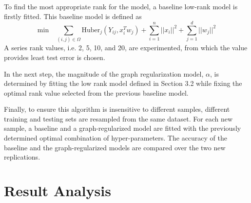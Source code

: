 \documentclass[a4paper]{article}
\begin{document}
To find the most appropriate rank for the model, a baseline low-rank model is firstly fitted. This baseline model is defined as 
\begin{equation*}
\text{min}\quad \sum_{(i,j)\in \Omega}\text{Huber}_j(Y_{ij},x_i^Tw_j)+\sum_{i=1}^n||x_i||^2+\sum_{j=1}^d||w_j||^2
\end{equation*}
A series rank values, i.e. 2, 5, 10, and 20, are experimented, from which the value provides least test error is chosen.

In the next step, the magnitude of the graph regularization model, $\alpha$, is determined by fitting the low rank model defined in Section 3.2 while fixing the optimal rank value selected from the previous baseline model.

Finally, to ensure this algorithm is insensitive to different samples, different training and testing sets are resampled from the same dataset. For each new sample, a baseline and a graph-regularized model are fitted with the previously determined optimal combination of hyper-parameters. The accuracy of the baseline and the graph-regularized models are compared over the two new replications. 


\section{Result Analysis}
\end{document}
